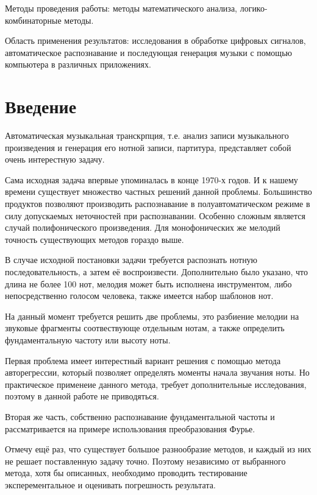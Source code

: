 \documentclass[oneside, final, 14pt]{extarticle}
\begin{document}
Методы проведения работы: методы математического анализа, логико-комбинаторные
методы.

Область применения результатов: исследования в обработке цифровых сигналов,
автоматическое распознавание и последующая генерация музыки с помощью
компьютера в различных приложениях.

\cleardoublepage


\tableofcontents
\cleardoublepage

\section{Введение}
  Автоматическая музыкальная транскрпция, т.е. анализ записи музыкального произведения
  и генерация его нотной записи, партитура, представляет собой очень интерестную задачу.

  Сама исходная задача впервые упоминалась в конце 1970-х годов. И к нашему времени
  существует множество частных решений данной проблемы. Большинство продуктов позволяют
  производить распознавание в полуавтоматическом режиме в силу допускаемых неточностей
  при распознавании. Особенно сложным является случай полифонического произведения.
  Для монофонических же мелодий точность существующих методов гораздо выше.

  В случае исходной постановки задачи требуется распознать нотную последовательность,
  а затем её воспроизвести. Дополнительно было указано, что длина не более 100 нот,
  мелодия может быть исполнена инструментом, либо непосредственно голосом человека,
  также имеется набор шаблонов нот.

  На данный момент требуется решить две проблемы, это разбиение мелодии на звуковые
  фрагменты соотвествующе отдельным нотам, а также определить фундаментальную частоту
  или высоту ноты.

  Первая проблема имеет интерестный вариант решения с помощью метода авторегрессии,
  который позволяет определять моменты начала звучания ноты. Но практическое
  применеие данного метода, требует дополнительные исследования, поэтому в данной
  работе не приводяться.

  Вторая же часть, собственно распознавание фундаментальной частоты и рассматривается
  на примере использования преобразования Фурье.

  Отмечу ещё раз, что существует большое разнообразие методов, и каждый из них
  не решает поставленную задачу точно. Поэтому независимо от выбранного метода, хотя
  бы описанных, необходимо проводить тестирование эксперементальное и оценивать
  погрешность результата.
\end{document}
